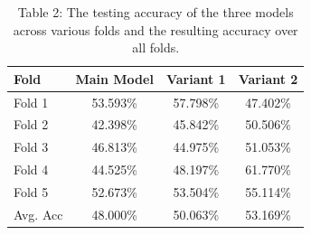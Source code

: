 \documentclass[letterpaper, 10 pt, conference]{ieeeconf}  %
\begin{document}
\begin{table}[!htb]
\begin{center}
 \begin{tabular}{||l c c c ||} 
 \hline
Fold & Main Model & Variant 1 & Variant 2  \\ [0.5ex] 
 \hline\hline
Fold 1 & 53.593\% & 57.798\% & 47.402\%  \\ 
 \hline
Fold 2 & 42.398\% & 45.842\% & 50.506\% \\ 
 \hline
Fold 3 & 46.813\% & 44.975\% & 51.053\% \\ 
 \hline
Fold 4 & 44.525\% & 48.197\% & 61.770\% \\ 
 \hline
Fold 5 & 52.673\% & 53.504\% & 55.114\% \\ 
 \hline
Avg. Acc& 48.000\% & 50.063\% & 53.169\% \\ 
 \hline
\end{tabular}
\caption{Table 2: The  testing accuracy of the three models across various folds and the resulting accuracy over all folds.}
\end{center}
\end{table}
\end{document}
